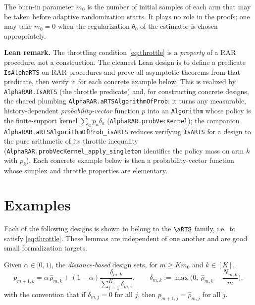 \begin{remark}\label{rem:burnin}
The burn-in parameter $m_0$ is the number of initial samples of each arm that
may be taken before adaptive randomization starts. It plays no role in the
proofs; one may take $m_0 = 0$ when the regularization $\theta_0$ of the
estimator is chosen appropriately.
\end{remark}

\textbf{Lean remark.} The throttling condition \eqref{eq:throttle} is a
\emph{property} of a RAR procedure, not a construction. The cleanest Lean design
is to define a predicate \texttt{IsAlphaRTS} on RAR procedures and prove all
asymptotic theorems from that predicate, then verify it for each concrete
example below. This is realized by \texttt{AlphaRAR.IsARTS} (the throttle predicate) and, for
constructing concrete designs, the shared plumbing
\texttt{AlphaRAR.aRTSAlgorithmOfProb}: it turns any measurable, history-dependent
\emph{probability-vector} function $p$ into an \texttt{Algorithm} whose policy is the finite-support
kernel $\sum_a p_a \delta_a$ (\texttt{AlphaRAR.probVecKernel}); the companion
\texttt{AlphaRAR.aRTSAlgorithmOfProb\_isARTS} reduces verifying \texttt{IsARTS} for a design to the
pure arithmetic of its throttle inequality (\texttt{AlphaRAR.probVecKernel\_apply\_singleton}
identifies the policy mass on arm $k$ with $p_k$). Each concrete example below is then a
probability-vector function whose simplex and throttle properties are elementary.

\section{Examples}
\label{sec:design_examples}

Each of the following designs is shown to belong to the $\aRTS$ family, i.e.\ to
satisfy \eqref{eq:throttle}. These lemmas are independent of one another and are
good small formalization targets.

\begin{definition}\label{def:distance_design}
\leanok
{}
Given $\alpha \in [0,1)$, the \emph{distance-based} design sets, for
$m \ge K m_0$ and $k \in [K]$,
\[
  p_{m+1,k} = \alpha\, \hat{\rho}_{m,k}
  + (1-\alpha)\frac{\delta_{m,k}}{\sum_{i=1}^K \delta_{m,i}},
  \qquad
  \delta_{m,k} := \max\!\Big(0,\ \hat{\rho}_{m,k} - \frac{N_{m,k}}{m}\Big),
\]
with the convention that if $\delta_{m,j} = 0$ for all $j$, then
$p_{m+1,j} = \hat{\rho}_{m,j}$ for all $j$.
\end{definition}

